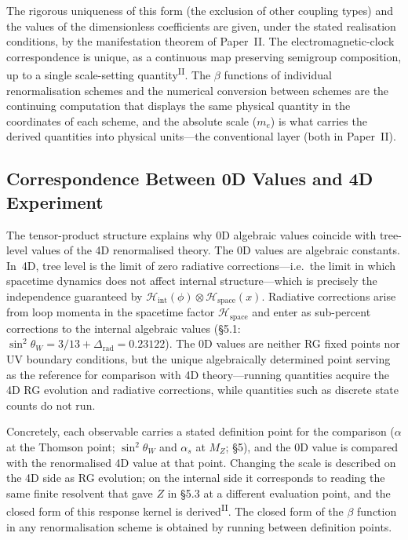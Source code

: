 \documentclass[12pt,a4paper]{article}
\newcommand{\PII}{\textsuperscript{\textup{II}}}
\begin{document}
The rigorous uniqueness of this form (the exclusion of other coupling types) and the values of the dimensionless coefficients are given, under the stated realisation conditions, by the manifestation theorem of Paper~II. The electromagnetic-clock correspondence is unique, as a continuous map preserving semigroup composition, up to a single scale-setting quantity\PII{}. The $\beta$ functions of individual renormalisation schemes and the numerical conversion between schemes are the continuing computation that displays the same physical quantity in the coordinates of each scheme, and the absolute scale ($m_e$) is what carries the derived quantities into physical units---the conventional layer (both in Paper~II).

\medskip
\subsection{Correspondence Between 0D Values and 4D Experiment}\label{sec:correspondence}

The tensor-product structure explains why 0D algebraic values
coincide with tree-level values of the 4D renormalised theory.
The 0D values are algebraic constants. In~4D, tree level is the limit of zero radiative
corrections---i.e.\ the limit in which spacetime dynamics does not
affect internal structure---which is precisely the independence
guaranteed by $\mathcal{H}_\mathrm{int}(\phi) \otimes \mathcal{H}_\mathrm{space}(x)$.
Radiative corrections arise from loop momenta in the spacetime
factor $\mathcal{H}_\mathrm{space}$ and enter as sub-percent corrections to the internal
algebraic values (\S5.1: $\sin^2\!\theta_W = 3/13 + \Delta_\mathrm{rad} = 0.23122$).
The 0D values are neither RG fixed points nor UV boundary conditions, but the unique algebraically determined point serving as the reference for comparison with 4D theory---running quantities acquire the 4D RG evolution and radiative corrections, while quantities such as discrete state counts do not run.

Concretely, each observable carries a stated definition point for the
comparison ($\alpha$ at the Thomson point; $\sin^2\!\theta_W$ and
$\alpha_s$ at $M_Z$; \S5), and the 0D value is compared with the
renormalised 4D value at that point. Changing the scale is described
on the 4D side as RG evolution; on the internal side it corresponds
to reading the same finite resolvent that gave $Z$ in \S5.3 at a
different evaluation point, and the closed form of this response
kernel is derived\PII{}. The closed form of the $\beta$
function in any renormalisation scheme is obtained by running between definition points.
\end{document}
